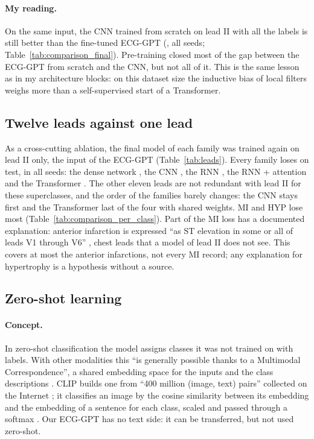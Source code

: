 


\paragraph{My reading.} On the same input, the CNN trained from scratch on lead II with all the labels is
still better than the fine-tuned ECG-GPT (\comparisonTestDiffMeanFinetuneFOneZeroZeroVsOneleadCnn{}, all
seeds; Table~\ref{tab:comparison_final}). Pre-training closed most of the gap between the ECG-GPT from
scratch and the CNN, but not all of it. This is the same lesson as in my architecture blocks: on this
dataset size the inductive bias of local filters weighs more than a self-supervised start of a
Transformer.

\subsection{Twelve leads against one lead}

As a cross-cutting ablation, the final model of each family was trained again on lead II only, the input
of the ECG-GPT (Table~\ref{tab:leads}). Every family loses on test, in
all seeds: the dense network \leadsTestDiffMeanDense{}, the CNN \leadsTestDiffMeanCnn{}, the RNN
\leadsTestDiffMeanRnn{}, the RNN + attention \leadsTestDiffMeanRnnattn{} and the Transformer
\leadsTestDiffMeanTransformer{}. The other eleven leads are not redundant with lead II for these
superclasses, and the order of the families barely changes: the CNN stays first and the Transformer last
of the four with shared weights. MI and HYP lose most (Table~\ref{tab:comparison_per_class}). Part of the
MI loss has a documented explanation: anterior infarction is expressed
``as ST elevation in some or all of leads V1 through V6'' \cite[p.~e265]{wagner2009aha}, chest leads that a model
of lead II does not see. This covers at most the anterior infarctions, not every MI record; any
explanation for hypertrophy is a hypothesis without a source.



\subsection{Zero-shot learning}

\paragraph{Concept.} In zero-shot classification the model assigns classes it was not trained on with
labels. With other modalities this ``is generally possible thanks to a Multimodal Correspondence'', a
shared embedding space for the inputs and the class descriptions \cite{course_summary_0910}. CLIP builds
one from ``400 million (image, text) pairs'' collected on the Internet \cite[p.~3]{radford2021learning}; it
classifies an image by the cosine similarity between its embedding and the embedding of a sentence for
each class, scaled and passed through a softmax \cite[p.~6]{radford2021learning}. Our ECG-GPT has no text side:
it can be transferred, but not used zero-shot.

